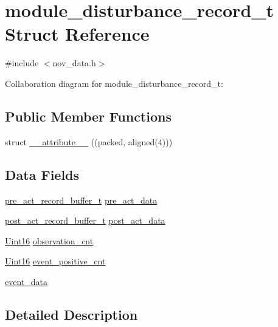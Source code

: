 \hypertarget{a00028}{\section{module\+\_\+disturbance\+\_\+record\+\_\+t Struct Reference}
\label{a00028}
}


{\ttfamily \#include $<$nov\+\_\+data.\+h$>$}



Collaboration diagram for module\+\_\+disturbance\+\_\+record\+\_\+t\+:
\subsection*{Public Member Functions}
\begin{DoxyCompactItemize}
\item 
struct \hyperlink{a00028_ad8187eb7fe09751a387e3dcb11c51565}{\+\_\+\+\_\+attribute\+\_\+\+\_\+} ((packed, aligned(4)))
\end{DoxyCompactItemize}
\subsection*{Data Fields}
\begin{DoxyCompactItemize}
\item 
\hyperlink{a00022_da/dc3/a00657}{pre\+\_\+act\+\_\+record\+\_\+buffer\+\_\+t} \hyperlink{a00028_aab01e8da056827bc5c9caff9b64c78be}{pre\+\_\+act\+\_\+data}
\item 
\hyperlink{a00022_a826f1702f1b63c184df702204bea5122}{post\+\_\+act\+\_\+record\+\_\+buffer\+\_\+t} \hyperlink{a00028_a9c699c0cc82d0baa6e49195f185ab34f}{post\+\_\+act\+\_\+data}
\item 
\hyperlink{a00072_a59a9f6be4562c327cbfb4f7e8e18f08b}{Uint16} \hyperlink{a00028_ad5b0bac02ce266b91b2b52a1c3ea1d78}{observation\+\_\+cnt}
\item 
\hyperlink{a00072_a59a9f6be4562c327cbfb4f7e8e18f08b}{Uint16} \hyperlink{a00028_a7397b9d76d4b57500f27bb23d258a18a}{event\+\_\+positive\+\_\+cnt}
\item 
\hyperlink{a00028_a8c0bda69e71ef674e60da47ad0be9ab0}{event\+\_\+data}
\end{DoxyCompactItemize}


\subsection{Detailed Description}


